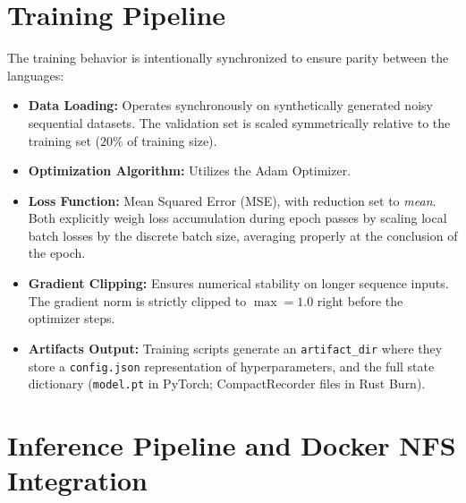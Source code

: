 \documentclass[12pt]{article}
\begin{document}
\section{Training Pipeline}
The training behavior is intentionally synchronized to ensure parity between the languages:
\begin{itemize}
    \item \textbf{Data Loading:} Operates synchronously on synthetically generated noisy sequential datasets. The validation set is scaled symmetrically relative to the training set ($20\%$ of training size).
    \item \textbf{Optimization Algorithm:} Utilizes the Adam Optimizer.
    \item \textbf{Loss Function:} Mean Squared Error (MSE), with reduction set to \textit{mean}. Both explicitly weigh loss accumulation during epoch passes by scaling local batch losses by the discrete batch size, averaging properly at the conclusion of the epoch.
    \item \textbf{Gradient Clipping:} Ensures numerical stability on longer sequence inputs. The gradient norm is strictly clipped to $\max = 1.0$ right before the optimizer steps.
    \item \textbf{Artifacts Output:} Training scripts generate an \texttt{artifact\_dir} where they store a \texttt{config.json} representation of hyperparameters, and the full state dictionary (\texttt{model.pt} in PyTorch; CompactRecorder files in Rust Burn).
\end{itemize}

\section{Inference Pipeline and Docker NFS Integration}
\end{document}
